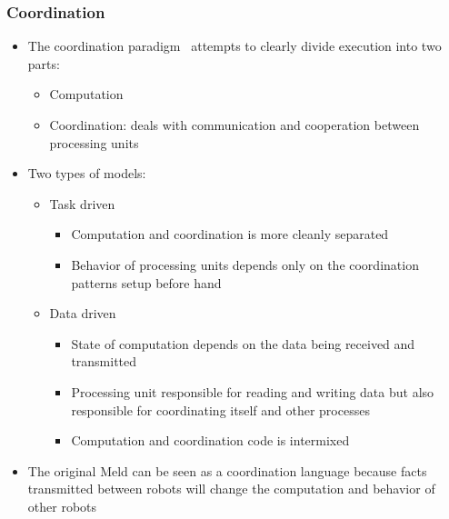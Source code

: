 \documentclass{beamer}
\begin{document}
\frame
{
   \frametitle{Coordination}
   \begin{itemize}
      \item The coordination paradigm~\cite{Papadopoulos98coordinationmodels} attempts to clearly divide execution into two parts:
      \begin{itemize}
         \item Computation
         \item Coordination: deals with communication and cooperation between processing units
      \end{itemize}
      \item Two types of models:
      \begin{itemize}
         \item Task driven
         \begin{itemize}
            \item Computation and coordination is more cleanly separated
            \item Behavior of processing units depends only on the coordination patterns setup before hand
         \end{itemize}
         \item Data driven
         \begin{itemize}
            \item State of computation depends on the data being received and transmitted
            \item Processing unit responsible for reading and writing data but also responsible for coordinating itself and other processes
            \item Computation and coordination code is intermixed
         \end{itemize}
      \end{itemize}
      \item The original Meld can be seen as a coordination language because facts transmitted between robots will change the computation and behavior of other robots
\end{itemize}
}

\end{document}
